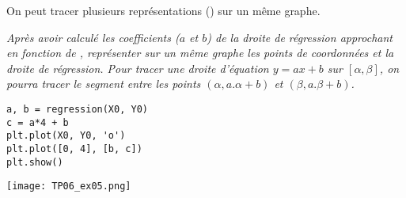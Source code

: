 \vskip -1cm

On peut tracer plusieurs représentations () sur un même graphe.
\begin{Exercise}[title=Tracé de la droite de régression]
\it Après avoir calculé les coefficients ($a$ et $b$) de la droite de régression approchant  en fonction de , représenter sur un même graphe les points de coordonnées  et la droite de régression. Pour tracer une droite d'équation $y = ax + b$ sur $[\alpha, \beta]$, on pourra tracer le segment entre les points $(\alpha, a.\alpha + b)$ et $(\beta, a.\beta + b)$.
\end{Exercise}
\begin{Answer}
\begin{lstlisting}
a, b = regression(X0, Y0)
c = a*4 + b
plt.plot(X0, Y0, 'o')
plt.plot([0, 4], [b, c])
plt.show()
\end{lstlisting}
\begin{center}
\texttt{[image: TP06\_ex05.png]} 
\end{center}
\end{Answer}
